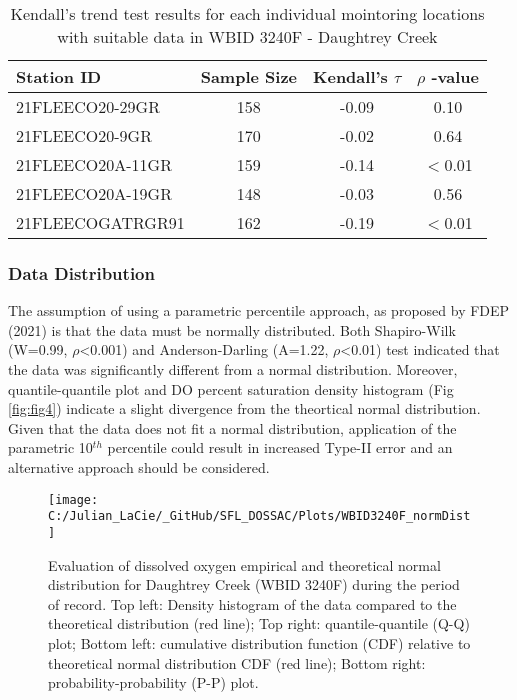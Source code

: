 \documentclass[]{interact}
\theoremstyle{plain}%
\theoremstyle{definition}
\theoremstyle{remark}
\begin{document}
\begin{table}[H]

\caption{\label{tab:unnamed-chunk-6}\label{tab:trendtab3} Kendall's trend test results for each individual mointoring locations with suitable data in WBID 3240F - Daughtrey Creek}
\centering
\fontsize{10}{12}\selectfont
\begin{tabular}[t]{lccc}
\toprule
Station ID & Sample Size & Kendall's $\tau$ & $\rho$ -value\\
\midrule
21FLEECO20-29GR & 158 & -0.09 & 0.10\\
21FLEECO20-9GR & 170 & -0.02 & 0.64\\
21FLEECO20A-11GR & 159 & -0.14 & $<$0.01\\
21FLEECO20A-19GR & 148 & -0.03 & 0.56\\
21FLEECOGATRGR91 & 162 & -0.19 & $<$0.01\\
\bottomrule
\end{tabular}
\end{table}

\hypertarget{data-distribution}{%
\subsubsection{Data Distribution}\label{data-distribution}}

The assumption of using a parametric percentile approach, as proposed by
FDEP (2021) is that the data must be normally distributed. Both
Shapiro-Wilk (W=0.99, \(\rho\)\textless0.001) and Anderson-Darling
(A=1.22, \(\rho\)\textless0.01) test indicated that the data was
significantly different from a normal distribution. Moreover,
quantile-quantile plot and DO percent saturation density histogram (Fig
\ref{fig:fig4}) indicate a slight divergence from the theortical normal
distribution. Given that the data does not fit a normal distribution,
application of the parametric 10\(^{th}\) percentile could result in
increased Type-II error and an alternative approach should be
considered.

\begin{figure}[H]

{\centering \texttt{[image: C:/Julian\_LaCie/\_GitHub/SFL\_DOSSAC/Plots/WBID3240F\_normDist]} 

}

\caption{\label{fig:fig4} Evaluation of dissolved oxygen empirical and theoretical normal distribution for Daughtrey Creek (WBID 3240F) during the period of record. Top left: Density histogram of the data compared to the theoretical distribution (red line); Top right: quantile-quantile (Q-Q) plot; Bottom left: cumulative distribution function (CDF) relative to theoretical normal distribution CDF (red line); Bottom right: probability-probability (P-P) plot.}\label{fig:unnamed-chunk-7}
\end{figure}
\end{document}
